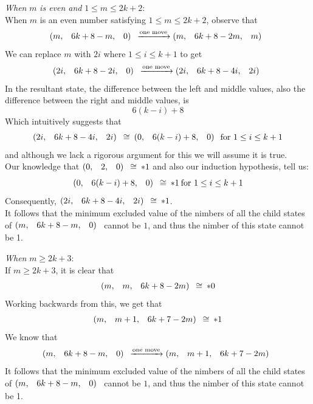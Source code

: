 \documentclass{article}
\makeatletter
\newcommand{\game}[3]{\begin{array}{@{}*6r}(#1, & #2, & #3)\end{array}}
\newcommand{\gcong}{\cong\:}
\makeatother
\begin{document}
\newpage
\textit{When} $m$ \textit{is even and} $1 \leq m \leq 2k + 2$:\\
When $m$ is an even number satisfying $1 \leq m \leq 2k + 2$,
observe that 
\begin{equation*}
  \game{m}{6k+8-m}{0} \xrightarrow{\text{one move}}
  \game{m}{6k+8-2m}{m}
\end{equation*}
We can replace $m$ with $2i$ where $1 \leq i \leq k + 1$ to get
\begin{equation*}
  \game{2i}{6k+8-2i}{0} \xrightarrow{\text{one move}}
  \game{2i}{6k+8-4i}{2i}
\end{equation*}
In the resultant state, the difference between the left and middle
values, also the difference between the right and middle values, is
\begin{equation*}
  6(k - i) + 8
\end{equation*}
Which intuitively suggests that
\begin{equation*}
  \game{2i}{6k+8-4i}{2i} \gcong \game{0}{6(k - i) + 8}{0} \:
  \text{for $1 \leq i \leq k + 1$}
\end{equation*}
and although we lack a rigorous argument for this we will assume it is
true. \\
Our knowledge that $\game{0}{2}{0} \gcong *1$ and also our induction
hypothesis, tell us:
\begin{equation*}
  \game{0}{6(k - i) + 8}{0} \gcong *1 \:
  \text{for $1 \leq i \leq k + 1$}
\end{equation*}
Consequently, $\game{2i}{6k+8-4i}{2i} \gcong *1$. \\
It follows that the minimum excluded value of the nimbers of
all the child states of $\game{m}{6k+8-m}{0}$ cannot be $1$, and
thus the nimber of this state cannot be 1.

\bigskip
\textit{When} $m \geq 2k + 3$:\\
If $m \geq 2k + 3$, it is clear that
\begin{equation*}
  \game{m}{m}{6k+8-2m} \gcong *0
\end{equation*}
Working backwards from this, we get that
\begin{equation*}
  \game{m}{m+1}{6k+7-2m} \gcong *1
\end{equation*}
We know that
\begin{equation*}
  \game{m}{6k+8-m}{0} \xrightarrow{\text{one move}}
  \game{m}{m+1}{6k+7-2m}
\end{equation*}
It follows that the minimum excluded value of the nimbers of
all the child states of $\game{m}{6k+8-m}{0}$ cannot be $1$, and
thus the nimber of this state cannot be 1.
\end{document}
